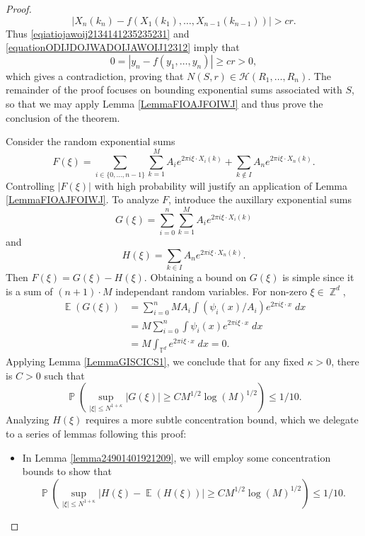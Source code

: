 \documentclass[dvipsnames,letterpaper,12pt]{article}
\numberwithin{equation}{section}
\DeclareMathOperator{\ZZ}{\mathbb{Z}}
\DeclareMathOperator{\TT}{\mathbb{T}}
\numberwithin{theorem}{section}
\DeclareMathOperator{\EE}{\mathbb{E}}
\DeclareMathOperator{\PP}{\mathbb{P}}
\begin{document}
\begin{proof}
    \begin{equation} \label{equationODIJDOJWADOIJAWOIJ12312}
        |X_n(k_n) - f(X_1(k_1),\dots,X_{n-1}(k_{n-1}))| > cr.
    \end{equation}
    Thus \eqref{eqiatiojawoij2134141235235231} and \eqref{equationODIJDOJWADOIJAWOIJ12312} imply that
    \begin{equation}
        0 = |y_n - f(y_1,\dots,y_n)| \geq cr > 0,
    \end{equation}
    which gives a contradiction, proving that $N(S,r) \in \mathcal{H}(R_1,\dots,R_n)$. The remainder of the proof focuses on bounding exponential sums associated with $S$, so that we may apply Lemma \ref{LemmaFIOAJFOIWJ} and thus prove the conclusion of the theorem.

    Consider the random exponential sums
    \[ F(\xi) = \sum_{i \in \{ 0, \dots, n-1 \}} \sum_{k = 1}^M A_i e^{2 \pi i \xi \cdot X_i(k)} + \sum_{k \not \in I} A_n e^{2 \pi i \xi \cdot X_n(k)}. \]
    Controlling $|F(\xi)|$ with high probability will justify an application of Lemma \ref{LemmaFIOAJFOIWJ}. To analyze $F$, introduce the auxillary exponential sums
    \[ G(\xi) = \sum_{i = 0}^n \sum_{k = 1}^M A_i e^{2 \pi i \xi \cdot X_i(k)} \]
    and
    \[ H(\xi) = \sum_{k \in I} A_n e^{2 \pi i \xi \cdot X_n(k)}. \]
    Then $F(\xi) = G(\xi) - H(\xi)$.
    Obtaining a bound on $G(\xi)$ is simple since it is a sum of $(n+1) \cdot M$ independant random variables. For non-zero $\xi \in \ZZ^d$,
    \begin{equation}
    \begin{split}
        \EE(G(\xi)) &= \sum_{i = 0}^n M A_i \int (\psi_i(x) / A_i) e^{2 \pi i \xi \cdot x}\; dx\\
        &= M \sum_{i = 0}^n \int \psi_i(x) e^{2 \pi i \xi \cdot x}\; dx\\
        &= M \int_{\TT^d} e^{2 \pi i \xi \cdot x}\; dx = 0.
    \end{split}
    \end{equation}
    Applying Lemma \ref{LemmaGISCICS1}, we conclude that for any fixed $\kappa > 0$, there is $C > 0$ such that
    \begin{equation} \label{equationCOIACOIAJCPPPPP}
        \PP \left( \sup_{|\xi| \leq N^{1 + \kappa}} |G(\xi)| \geq C M^{1/2} \log(M)^{1/2} \right) \leq 1/10.
    \end{equation}
    Analyzing $H(\xi)$ requires a more subtle concentration bound, which we delegate to a series of lemmas following this proof:
    \begin{itemize}
        \item In Lemma \ref{lemma24901401921209}, we will employ some concentration bounds to show that
        \begin{equation} \label{equationCICCIJCISJCOXOXP12}
            \PP \left( \sup_{|\xi| \leq N^{1 + \kappa}} | H(\xi) - \EE(H(\xi)) | \geq C M^{1/2} \log(M)^{1/2} \right) \leq 1/10.
        \end{equation}
    

\end{itemize}
\end{proof}
\end{document}
